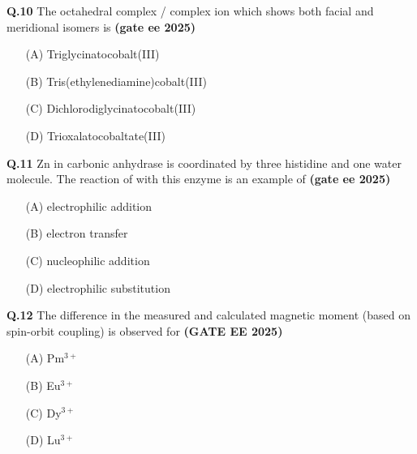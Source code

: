 \documentclass[journal,12pt,onecolumn]{exam}
\theoremstyle{remark}
\begin{document}
\noindent \textbf{Q.10} The octahedral complex / complex ion which shows both facial and meridional isomers is \hfill{\textbf{(gate ee 2025)}}
\begin{multicols}{2}
    
\begin{itemize}
    \item[(A)] Triglycinatocobalt(III)
    \item[(B)] Tris(ethylenediamine)cobalt(III)
    \item[(C)] Dichlorodiglycinatocobalt(III)
    \item[(D)] Trioxalatocobaltate(III)
\end{itemize}
\end{multicols}
\vspace{0.5 cm}

\noindent \textbf{Q.11} Zn in carbonic anhydrase is coordinated by three histidine and one water molecule. The reaction of  with this enzyme is an example of \hfill{\textbf{(gate ee 2025)}}
\begin{multicols}{4}
    

\begin{itemize}
    \item[(A)] electrophilic addition
    \item[(B)] electron transfer
    \item[(C)] nucleophilic addition
    \item[(D)] electrophilic substitution
\end{itemize}

\end{multicols}
\vspace{0.5 cm}

\noindent \textbf{Q.12} The difference in the measured and calculated magnetic moment (based on spin-orbit coupling) is observed for \hfill{\textbf{(GATE EE 2025)}}
\begin{multicols}{2}
\begin{itemize}[leftmargin=*,labelsep=1em]
    \item[(A)] Pm$^{3+}$
    \item[(B)] Eu$^{3+}$
    \item[(C)] Dy$^{3+}$
    \item[(D)] Lu$^{3+}$
\end{itemize}
\end{multicols}
\vspace{0.5cm}
\end{document}
